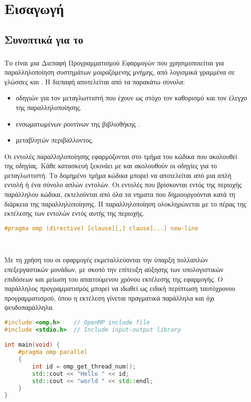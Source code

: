 \section{Εισαγωγή}
\subsection{Συνοπτικά για το }
\subparagraph{}
Το  είναι μια Διεπαφή Προγραμματισμού Εφαρμογών  που χρησιμοποιείται για παραλληλοποίηση συστημάτων μοιραζόμενης μνήμης, από λογισμικά γραμμένα σε γλώσσες  και . Η διεπαφή αποτελείται από τα παρακάτω σύνολα\cite{thenextstep20}:
\begin{itemize}
    \item οδηγιών για τον μεταγλωττιστή που έχουν ως στόχο τον καθορισμό και τον έλεγχο της παραλληλοποίησης.
    \item ενσωματωμένων ρουτίνων της βιβλιοθήκης .
    \item μεταβλητών περιβάλλοντος.
\end{itemize}

Οι εντολές παραλληλοποίησης εφαρμόζονται στο τμήμα του κώδικα που ακολουθεί της οδηγίας. Κάθε κατασκευή ξεκινάει με \emph{} και ακολουθούν οι οδηγίες για το μεταγλωττιστή. Το δομημένο τμήμα κώδικα μπορεί να αποτελείται από μια απλή εντολή ή ένα σύνολο απλών εντολών\cite{ompsyntaxrefguide}. Οι εντολές που βρίσκονται εντός της περιοχής παράλληλου κώδικα, εκτελούνται από όλα τα νηματα που δημιουργούνται κατά τη διάρκεια της παραλληλοποίησης. Η παραλληλοποίηση ολοκληρώνεται με το πέρας της εκτέλεσης των εντολών εντός αυτής της περιοχής.
\ \\
\begin{lstlisting}[language=C++, caption={\el{Γραμματική σύνταξης οδηγίας} OpenMP}, frame = single, xleftmargin=.1\textwidth]
#pragma omp (directive) [clause[[,] clause]...] new-line
\end{lstlisting} 
\ \\
\par
Με τη χρήση του \emph{} οι εφαρμογές εκμεταλλεύονται την ύπαρξη πολλαπλών επεξεργαστικών μονάδων, με σκοπό την επίτευξη αύξησης των υπολογιστικών επιδόσεων και μείωση του απαιτούμενου χρόνου εκτέλεσης της εφαρμογής. Ο παράλληλος προγραμματισμός μπορεί να ιδωθεί ως ειδική περίπτωση ταυτόχρονου προγραμματισμού, όπου η εκτέλεση γίνεται πραγματικά παράλληλα και όχι ψευδοπαράλληλα\cite{googleparallelprog}.
\ \\
\begin{lstlisting}[language=C++, caption={\el{Παράδειγμα παράλληλου κώδικα} OpenMP}, frame=tb]
#include <omp.h>    // OpenMP include file
#include <stdio.h>  // Include input-output library

int main(void) {
	#pragma omp parallel	
	{
		int id = omp_get_thread_num();
		std::cout << "Hello " << id;
		std::cout << "world " << std::endl;
	}
}
\end{lstlisting}

